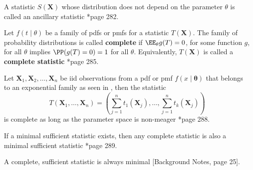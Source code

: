 \begin{defe} \label{defe: ancillary_statistic}
    A statistic $S(\bm{X})$ whose distribution does not depend on the parameter $\theta$ is called an ancillary statistic \cite{CasellaGeorge2001SI}*{page 282}.
\end{defe}

\begin{defe} \label{defe: complete_statistic}
    Let $f(t \mid \theta)$ be a family of pdfs or pmfs for a statistic $T(\bm{X})$. The family of probability distributions is called {\bf complete} if $\EE_{\theta} g(T) = 0$, for some function $g$, for all $\theta$ implies $\PP (g(T) = 0) = 1$ for all $\theta$. Equivalently, $T(\bm{X})$ is called a {\bf complete statistic} \cite{CasellaGeorge2001SI}*{page 285}.
\end{defe}

\begin{thm} \label{thm: exp_fam_complete}
    Let $\bm{X}_1 , \bm{X}_2 , \ldots , \bm{X}_n$ be iid observations from a pdf or pmf $f(x \mid \bm{\theta})$ that belongs to an exponential family as seen in , then the statistic
    \begin{equation*}
        T(\bm{X}_1 , \ldots , \bm{X}_n) = \left( \sum_{j=1}^{n} t_1 (\bm{X}_j) , \ldots , \sum_{j=1}^{n} t_k (\bm{X}_j) \right)
    \end{equation*}
    is complete as long as the parameter space is non-meager \cite{CasellaGeorge2001SI}*{page 288}.
\end{thm}

\begin{thm} \label{thm: min_and_complete}
    If a minimal sufficient statistic exists, then any complete statistic is also a minimal sufficient statistic \cite{CasellaGeorge2001SI}*{page 289}.
\end{thm}

\begin{thm} \label{thm: suf_comp_min}
    A complete, sufficient statistic is always minimal [Background Notes, page 25].
\end{thm}

